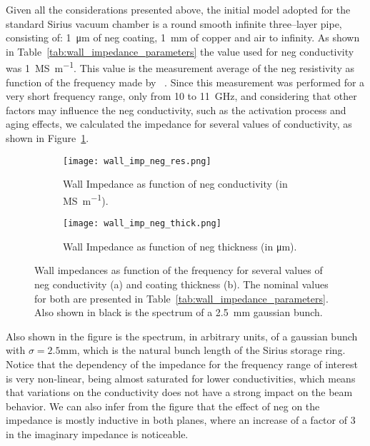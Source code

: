     Given all the considerations presented above, the initial model adopted for the standard Sirius vacuum chamber is a round smooth infinite three--layer pipe, consisting of: \SI{1}{\micro\meter} of \gls{neg} coating, \SI{1}{\milli\meter} of copper and air to infinity. As shown in Table~\ref{tab:wall_impedance_parameters} the value used for \gls{neg} conductivity was \SI{1}{\mega\siemens\per\meter}. This value is the measurement average of the \gls{neg} resistivity as function of the frequency made by ~. Since this measurement was performed for a very short frequency range, only from \SI{10}{} to \SI{11}{\giga\hertz}, and considering that other factors may influence the \gls{neg} conductivity, such as the activation process and aging effects, we calculated the impedance for several values of conductivity, as shown in Figure~\ref{fig:wall_impedance_neg_res}.
    \begin{figure}
        \def \mysize {\textwidth}
        \centering
        \begin{subfigure}[c]{\textwidth}
            \centering
            \texttt{[image: wall\_imp\_neg\_res.png]}
            \caption{Wall Impedance as function of \gls{neg} conductivity (in \si{\mega\siemens\per\meter}).}
            \label{fig:wall_impedance_neg_res}
        \end{subfigure}
        \begin{subfigure}[c]{\textwidth}
            \centering
            \texttt{[image: wall\_imp\_neg\_thick.png]}
            \caption{Wall Impedance as function of \gls{neg} thickness (in \si{\micro\meter}).}
            \label{fig:wall_impedance_neg_thick}
        \end{subfigure}
        \caption[Neg effect on impedance.]{Wall impedances as function of the frequency for several values of \gls{neg} conductivity (a) and coating thickness (b). The nominal values for both are presented in Table~\ref{tab:wall_impedance_parameters}. Also shown in black is the spectrum of a \SI{2.5}{\milli\meter} gaussian bunch.}
        \label{fig:wall_impedance_neg}
    \end{figure}
    Also shown in the figure is the spectrum, in arbitrary units, of a gaussian bunch with $\sigma=2.5$\si{\milli\meter}, which is the natural bunch length of the Sirius storage ring. Notice that the dependency of the impedance for the frequency range of interest is very non-linear, being almost saturated for lower conductivities, which means that variations on the conductivity does not have a strong impact on the beam behavior. We can also infer from the figure that the effect of \gls{neg} on the impedance is mostly inductive in both planes, where an increase of a factor of \SI{3}{} in the imaginary impedance is noticeable.

